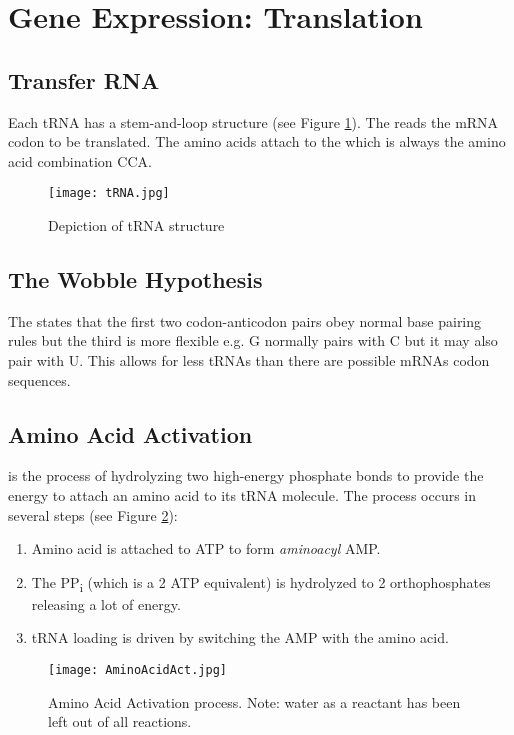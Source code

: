 \documentclass[../Bio_chemistryReview.tex]{subfiles}
\begin{document}
\section{Gene Expression: Translation}

\subsection{Transfer RNA}
Each tRNA has a stem-and-loop structure (see Figure \ref{fig:tRNA}). The
 reads the mRNA codon to be translated. The amino acids
attach to the  which is always the amino acid
combination CCA.

\begin{figure}[H] 
  \centering 
  \texttt{[image: tRNA.jpg]}
  \caption{Depiction of tRNA structure} 
  \label{fig:tRNA} 
\end{figure}

\subsection{The Wobble Hypothesis}
The  states that the first two codon-anticodon pairs
obey normal base pairing rules but the third is more flexible e.g. G normally
pairs with C but it may also pair with U. This allows for less tRNAs than there
are possible mRNAs codon sequences. 

\subsection{Amino Acid Activation}
 is the process of hydrolyzing two high-energy
phosphate bonds to provide the energy to attach an amino acid to its tRNA
molecule. The process occurs in several steps (see Figure \ref{fig:AAact}):
\begin{enumerate}
  \item Amino acid is attached to ATP to form \textit{aminoacyl} AMP.
  \item The PP\textsubscript{i} (which is a 2 ATP equivalent) is hydrolyzed to 2
    orthophosphates releasing a lot of energy.
  \item tRNA loading is driven by switching the AMP with the amino acid.
\end{enumerate}
\begin{figure}[H]
  \centering
  \texttt{[image: AminoAcidAct.jpg]}
  \caption{Amino Acid Activation process. Note: water as a reactant has been
  left out of all reactions.}
  \label{fig:AAact}
\end{figure}
\end{document}
